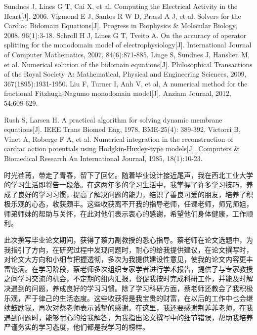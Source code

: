 \documentclass[twoside,UTF8]{nputhesis}
\begin{document}
\begin{thebibliography}{99}
	Sundnes J, Lines G T, Cai X, et al. Computing the Electrical Activity in the Heart[J]. 2006.
	Vigmond E J, Santos R W D, Prassl A J, et al. Solvers for the Cardiac Bidomain Equations[J]. Progress in Biophysics \& Molecular Biology, 2008, 96(1):3-18.
	Schroll H J, Lines G T, Tveito A. On the accuracy of operator splitting for the monodomain model of electrophysiology[J]. International Journal of Computer Mathematics, 2007, 84(6):871-885.
	Linge S, Sundnes J, Hanslien M, et al. Numerical solution of the bidomain equations[J]. Philosophical Transactions of the Royal Society A: Mathematical, Physical and Engineering Sciences, 2009, 367(1895):1931-1950.
	Liu F, Turner I, Anh V, et al, A numerical method for the fractional Fitzhugh-Nagumo monodomain model[J], Anziam Journal, 2012, 54:608-629.
	
	
	Rush S, Larsen H. A practical algorithm for solving dynamic membrane equations[J]. IEEE Trans Biomed Eng, 1978, BME-25(4): 389-392.
	Victorri B, Vinet A, Roberge F A, et al. Numerical integration in the reconstruction of cardiac action potentials using Hodgkin-Huxley-type models[J]. Computers \& Biomedical Research An International Journal, 1985, 18(1):10-23.
	

\end{thebibliography}
 

\Thanks

时光荏苒，带走了青春，留下了回忆。随着毕业设计接近尾声，我在西北工业大学的学习生活即将告一段落。在这两年多的学习生活中，我掌握了许多学习技巧，养成了良好的学习习惯，提高了解决问题的能力，结识了善良可爱的朋友，培养了积极乐观的心态，收获颇丰。这些收获离不开我的指导老师，任课老师，师兄师姐，师弟师妹的帮助与关怀，在此对他们表示衷心的感谢，希望他们身体健康，工作顺利。

此次撰写毕业论文期间，获得了蔡力副教授的悉心指导。蔡老师在论文选题中，为我指引了方向，在研究过程中发现问题时，耐心的给我提供建议，在论文撰写时，对论文大方向和小细节把握透彻，多次为我提供建设性意见，使我的论文内容更丰富饱满。在学习阶段，蔡老师多次组织专家学者进行学术报告，提供了与专家教授之间学习交流的机会，不定期的组内汇报，督促我按时完成科研工作，并能及时解决遇到的问题，养成良好的学习习惯。除了学习科研方面，蔡老师还教会了我积极乐观，严于律己的生活态度。这些收获将是我宝贵的财富，在以后的工作中也会继续鼓励我，再次对蔡老师表示诚挚的感谢。在这里，我还要感谢荆菲菲老师，在我遇到问题时，能够耐心的给我解答，为我指出论文撰写中的细节错误，帮助我培养严谨务实的学习态度，他们都是我学习的榜样。
\end{document}
